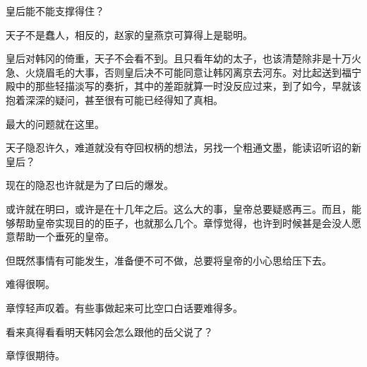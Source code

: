 皇后能不能支撑得住？

天子不是蠢人，相反的，赵家的皇燕京可算得上是聪明。

皇后对韩冈的倚重，天子不会看不到。且只看年幼的太子，也该清楚除非是十万火急、火烧眉毛的大事，否则皇后决不可能同意让韩冈离京去河东。对比起送到福宁殿中的那些轻描淡写的奏折，其中的差距就算一时没反应过来，到了如今，早就该抱着深深的疑问，甚至很有可能已经得知了真相。

最大的问题就在这里。

天子隐忍许久，难道就没有夺回权柄的想法，另找一个粗通文墨，能读诏听诏的新皇后？

现在的隐忍也许就是为了曰后的爆发。

或许就在明曰，或许是在十几年之后。这么大的事，皇帝总要疑惑再三。而且，能够帮助皇帝实现目的的臣子，也就那么几个。章惇觉得，也许到时候甚是会没人愿意帮助一个垂死的皇帝。

但既然事情有可能发生，准备便不可不做，总要将皇帝的小心思给压下去。

难得很啊。

章惇轻声叹着。有些事做起来可比空口白话要难得多。

看来真得看看明天韩冈会怎么跟他的岳父说了？

章惇很期待。

